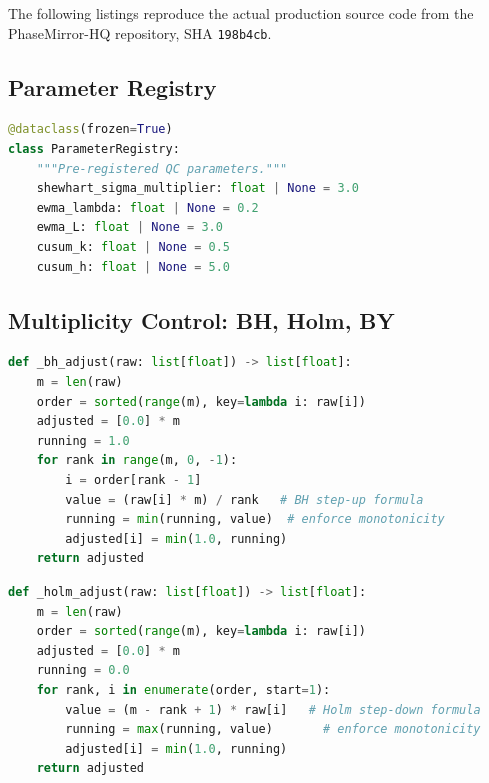 \documentclass[11pt,a4paper]{article}
\begin{document}
The following listings reproduce the actual production source code from the
PhaseMirror-HQ repository, SHA \texttt{198b4cb}.

\subsection{Parameter Registry}
\label{lst:registry}

\begin{lstlisting}[language=Python,
  caption={ParameterRegistry dataclass (\texttt{qc\_univariate.py})},
  label={lst:registry}]
@dataclass(frozen=True)
class ParameterRegistry:
    """Pre-registered QC parameters."""
    shewhart_sigma_multiplier: float | None = 3.0
    ewma_lambda: float | None = 0.2
    ewma_L: float | None = 3.0
    cusum_k: float | None = 0.5
    cusum_h: float | None = 5.0
\end{lstlisting}

\subsection{Multiplicity Control: BH, Holm, BY}

\begin{lstlisting}[language=Python,
  caption={Benjamini-Hochberg adjustment (\texttt{multiplicity.py})},
  label={lst:bh}]
def _bh_adjust(raw: list[float]) -> list[float]:
    m = len(raw)
    order = sorted(range(m), key=lambda i: raw[i])
    adjusted = [0.0] * m
    running = 1.0
    for rank in range(m, 0, -1):
        i = order[rank - 1]
        value = (raw[i] * m) / rank   # BH step-up formula
        running = min(running, value)  # enforce monotonicity
        adjusted[i] = min(1.0, running)
    return adjusted
\end{lstlisting}

\begin{lstlisting}[language=Python,
  caption={Holm-Bonferroni adjustment (\texttt{multiplicity.py})},
  label={lst:holm}]
def _holm_adjust(raw: list[float]) -> list[float]:
    m = len(raw)
    order = sorted(range(m), key=lambda i: raw[i])
    adjusted = [0.0] * m
    running = 0.0
    for rank, i in enumerate(order, start=1):
        value = (m - rank + 1) * raw[i]   # Holm step-down formula
        running = max(running, value)       # enforce monotonicity
        adjusted[i] = min(1.0, running)
    return adjusted
\end{lstlisting}
\end{document}
